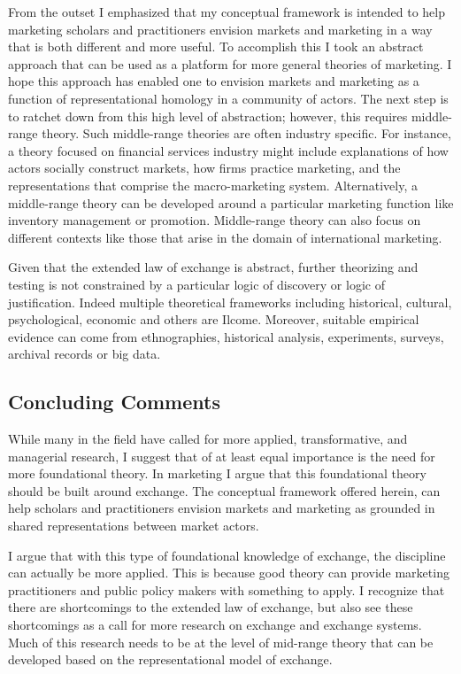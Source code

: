 	From the outset I emphasized that my conceptual framework is intended to help marketing scholars and practitioners envision markets and marketing in a way that is both different and more useful. To accomplish this I took an abstract approach that can be used as a platform for more general theories of marketing. I hope this approach has enabled one to envision markets and marketing as a function of representational homology in a community of actors. The next step is to ratchet down from this high level of abstraction; however, this requires middle-range theory. Such middle-range theories are often industry specific. For instance, a theory focused on financial services industry might include explanations of how actors socially construct markets, how firms practice marketing, and the representations that comprise the macro-marketing system. Alternatively, a middle-range theory can be developed around a particular marketing function like inventory management or promotion. Middle-range theory can also focus on different contexts like those that arise in the domain of international marketing. 

	Given that the extended law of exchange is abstract, further theorizing and testing is not constrained by a particular logic of discovery or logic of justification. Indeed multiple theoretical frameworks including historical, cultural, psychological, economic and others are Ilcome. Moreover, suitable empirical evidence can come from ethnographies, historical analysis, experiments, surveys, archival records or big data. 

\subsection{Concluding Comments}
While many in the field have called for more applied, transformative, and managerial research, I suggest that of at least equal importance is the need for more foundational theory. In marketing I argue that this foundational theory should be built around exchange. The conceptual framework offered herein, can help scholars and practitioners envision markets and marketing as grounded in shared representations between market actors. 
	
I argue that with this type of foundational knowledge of exchange, the discipline can actually be more applied. This is because good theory can provide marketing practitioners and public policy makers with something to apply. I recognize that there are shortcomings to the extended law of exchange, but also see these shortcomings as a call for more research on exchange and exchange systems. Much of this research needs to be at the level of mid-range theory that can be developed based on the representational model of exchange.
